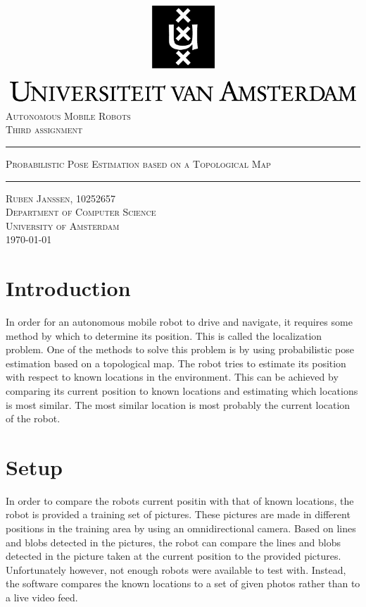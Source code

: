 \documentclass[12pt]{article}
\begin{document}
\begin{titlepage}
\begin{center}
    \includegraphics[width=\textwidth]{./logo.png}
    \\ [2.5cm]
    \textsc{\Large Autonomous Mobile Robots}
    \\ [0.5cm]
    \textsc{\large Third assignment}
    \\ [1cm]
    \hrule
    \vspace{0.3cm}
    \textsc{Probabilistic Pose Estimation based on a Topological Map}
    \\ [0.3cm]
    \hrule
    \vfill
    \textsc{Ruben Janssen, 10252657 \\[0.7cm] Department of Computer Science \\ University of Amsterdam \\[0.3cm] \today}
\end{center}
\end{titlepage}
\tableofcontents
\clearpage
\section{Introduction}
In order for an autonomous mobile robot to drive and navigate, it requires some method by which to determine its position. This is called the localization problem. One of the methods to solve this problem is by using probabilistic pose estimation based on a topological map. The robot tries to estimate its position with respect to known locations in the environment. This can be achieved by comparing its current position to known locations and estimating which locations is most similar. The most similar location is most probably the current location of the robot.

\section{Setup}
In order to compare the robots current positin with that of known locations, the robot is provided a training set of pictures. These pictures are made in different positions in the training area by using an omnidirectional camera. Based on lines and blobs detected in the pictures, the robot can compare the lines and blobs detected in the picture taken at the current position to the provided pictures. Unfortunately however, not enough robots were available to test with. Instead, the software compares the known locations to a set of given photos rather than to a live video feed.
\end{document}

